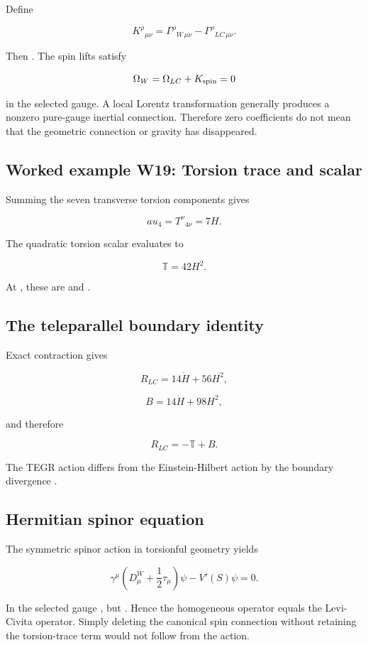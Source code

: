 \documentclass[11pt]{article}
\begin{document}
Define

\[
K^\rho{}_{\mu\nu}
=\Gamma^\rho{}_{W\,\mu\nu}-\Gamma^\rho{}_{LC\,\mu\nu}.
\]

Then \texttt{}. The spin lifts satisfy

\[
\Omega_W=\Omega_{LC}+K_{\rm spin}=0
\]

in the selected gauge. A local Lorentz transformation generally produces a nonzero pure-gauge inertial connection. Therefore zero coefficients do not mean that the geometric connection or gravity has disappeared.

\subsection{Worked example W19: Torsion trace and scalar}

Summing the seven transverse torsion components gives

\[
	au_4=T^\nu{}_{4\nu}=7H.
\]

The quadratic torsion scalar evaluates to

\[
\mathbb T=42H^2.
\]

At \texttt{}, these are \texttt{} and \texttt{}.

\subsection{The teleparallel boundary identity}

Exact contraction gives

\[
R_{LC}=14\dot H+56H^2,
\]

\[
B=14\dot H+98H^2,
\]

and therefore

\[
\boxed{R_{LC}=-\mathbb T+B.}
\]

The TEGR action \texttt{} differs from the Einstein-Hilbert action by the boundary divergence \texttt{}.

\subsection{Hermitian spinor equation}

The symmetric spinor action in torsionful geometry yields

\[
\gamma^\mu\left(D^W_\mu+\frac12\tau_\mu\right)\psi
-V'(S)\psi=0.
\]

In the selected gauge \texttt{}, but \texttt{}. Hence the homogeneous operator equals the Levi-Civita operator. Simply deleting the canonical spin connection without retaining the torsion-trace term would not follow from the action.
\end{document}
